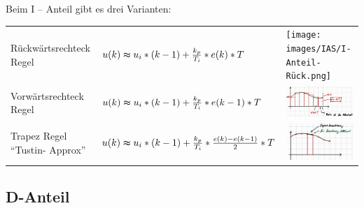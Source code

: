 \documentclass[
  10pt,
  a4paper,
  onecolumn]{article}
\numberwithin{equation}{section}
\begin{document}
Beim I -- Anteil gibt es drei Varianten:

\begin{longtable}[]{@{}
  >{\raggedright\arraybackslash}p{}
  >{\raggedright\arraybackslash}p{}
  >{\raggedright\arraybackslash}p{}@{}}
\toprule\noalign{}
\endhead
\bottomrule\noalign{}
\endlastfoot
Rückwärtsrechteck Regel & \(
u(k) \thickapprox u_i * (k-1) +\frac{k_p}{T_i}*e(k) * T
\) & \texttt{[image: images/IAS/I-Anteil-Rück.png]} \\
Vorwärtsrechteck Regel &
\( u(k) \thickapprox u_i * (k-1) +\frac{k_p}{T_i}*e(k - 1) * T
\) & \includegraphics{images/IAS/I-Anteil-Vor.png} \\
Trapez Regel ``Tustin- Approx'' & \(
u(k) \thickapprox u_i * (k-1) +\frac{k_p}{T_i}*\frac{e(k) - e(k-1)}{2}*T
\) & \includegraphics{images/IAS/I-Anteil-Trapez.png} \\
\end{longtable}

\hypertarget{d-anteil}{%
\subsection{D-Anteil}\label{d-anteil}}
\end{document}
